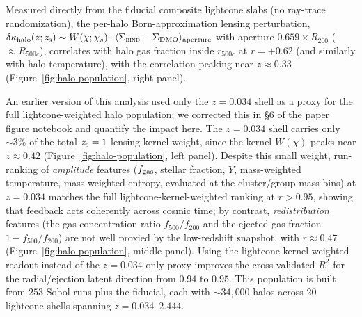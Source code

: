 \documentclass[11pt]{article}
\newcommand{\bind}{\textsc{bind}}
\newcommand{\fgas}{f_{\rm gas}}
\newcommand{\zs}{z_{\rm s}}
\begin{document}
Measured directly from the fiducial composite lightcone slabs (no
ray-trace randomization), the per-halo Born-approximation lensing
perturbation, $\delta\kappa_{\rm halo}(z;\zs) \sim W(\chi;\chi_s)\cdot
\langle \Sigma_{\bind}-\Sigma_{\rm DMO}\rangle_{\rm aperture}$ with
aperture $0.659\times R_{200}$ ($\approx R_{500c}$), correlates with halo
gas fraction inside $r_{500c}$ at $r=+0.62$ (and similarly with halo
temperature), with the correlation peaking near $z\approx0.33$
(Figure~\ref{fig:halo-population}, right panel). %

An earlier version of this analysis used only the $z=0.034$ shell as a
proxy for the full lightcone-weighted halo population; we corrected this
in \S6 of the paper figure notebook and quantify the impact here. The
$z=0.034$ shell carries only $\sim\!3\%$ of the total $\zs=1$ lensing
kernel weight, since the kernel $W(\chi)$ peaks near $z\approx0.42$
(Figure~\ref{fig:halo-population}, left panel). %
Despite this small weight, run-ranking of \emph{amplitude} features
($\fgas$, stellar fraction, $Y$, mass-weighted temperature, mass-weighted
entropy, evaluated at the cluster/group mass bins) at $z=0.034$ matches
the full lightcone-kernel-weighted ranking at $r>0.95$, showing that
feedback acts coherently across cosmic time; by contrast, \emph{redistribution}
features (the gas concentration ratio $f_{500}/f_{200}$ and the ejected
gas fraction $1-f_{500}/f_{200}$) are not well proxied by the low-redshift
snapshot, with $r\approx0.47$ (Figure~\ref{fig:halo-population}, middle
panel). %
Using the lightcone-kernel-weighted readout instead of the $z=0.034$-only
proxy improves the cross-validated $R^2$ for the radial/ejection latent
direction from $0.94$ to $0.95$. %
This population is built from $253$ Sobol runs plus the fiducial, each
with $\sim\!34{,}000$ halos across 20 lightcone shells spanning
$z=0.034$–$2.444$. %
\end{document}
